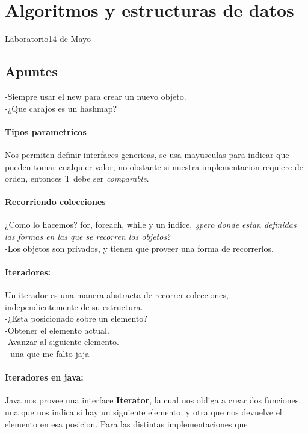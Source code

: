 \documentclass[10pt, a4paper]{article}
\begin{document}
\section*{Algoritmos y estructuras de datos}
{\large Laboratorio{\hfill 14 de Mayo}}
\subsection*{Apuntes}
\noindent -Siempre usar el new para crear un nuevo objeto.
\\-¿Que carajos es un hashmap?
\\\paragraph*{Tipos parametricos} Nos permiten definir interfaces genericas, se usa mayusculas para indicar que pueden tomar cualquier valor, no obstante si nuestra implementacion requiere de orden, entonces T debe ser \emph{comparable}.
\\\paragraph{Recorriendo colecciones} ¿Como lo hacemos? for, foreach, while y un indice, \emph{¿pero donde estan definidas las formas en las que se recorren los objetos?}
\\-Los objetos son privados, y tienen que proveer una forma de recorrerlos.
\\\paragraph*{Iteradores:}Un iterador es una manera abstracta de recorrer colecciones, \\independientemente de su estructura.
\\-¿Esta posicionado sobre un elemento?
\\-Obtener el elemento actual.
\\-Avanzar al siguiente elemento.
\\- una que me falto jaja
\\\paragraph*{Iteradores en java:} Java nos provee una interface \textbf{Iterator}, 
la cual nos obliga a crear dos funciones, una que nos indica si hay un siguiente elemento, 
y otra que nos devuelve el elemento en esa posicion. Para las distintas implementaciones que 
\end{document}
